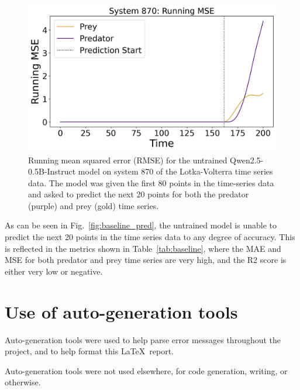 \documentclass[11pt,a4paper]{article}
\begin{document}
\begin{figure}
    \centering
    \includegraphics[width=\columnwidth, keepaspectratio]{../plots/running_mse_example.png}
    \caption{Running mean squared error (RMSE) for the untrained Qwen2.5-0.5B-Instruct model on system 870 of the Lotka-Volterra time series data. The model was given the first 80 points in the time-series data and asked to predict the next 20 points for both the predator (purple) and prey (gold) time series.}
    \label{fig:baseline_rmse}
\end{figure}

As can be seen in Fig.~\ref{fig:baseline_pred}, the untrained model is unable to predict the next 20 points in the time series data to any degree of accuracy. This is reflected in the metrics shown in Table~\ref{tab:baseline}, where the MAE and MSE for both predator and prey time series are very high, and the R2 score is either very low or negative. 
\clearpage


\appendix
\section{Use of auto-generation tools}
Auto-generation tools were used to help parse error messages throughout the project, and to help format this \LaTeX\ report.

Auto-generation tools were not used elsewhere, for code generation, writing, or otherwise.
\end{document}
